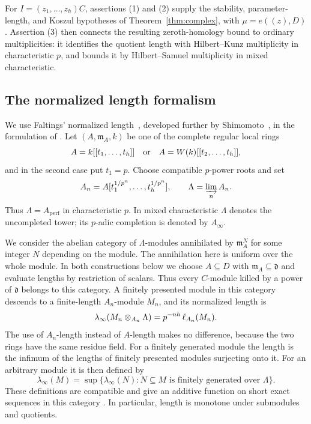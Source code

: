 For $I=(z_1,\ldots,z_h)C$, assertions (1) and (2) supply the
stability, parameter-length, and Koszul hypotheses of
Theorem~\ref{thm:complex}, with $\mu=e((z),D)$.
Assertion (3) then connects the resulting zeroth-homology bound to
ordinary multiplicities: it identifies the quotient length with
Hilbert--Kunz multiplicity in characteristic $p$, and bounds it by
Hilbert--Samuel multiplicity in mixed characteristic.

\subsection{The normalized length formalism}

We use Faltings' normalized length~\cite[Appendix~2]{Faltings},
developed further by Shimomoto~\cite[Section~2]{Shimomoto}, in the
formulation of \cite[Section~2.2]{CLMST}. Let $(A,\mathfrak
m_A,k)$ be one of the complete regular local rings
\[
 A=k[[t_1,\ldots,t_h]]
 \quad\hbox{or}\quad
 A=W(k)[[t_2,\ldots,t_h]],
\]
and in the second case put $t_1=p$.  Choose compatible $p$-power roots
and set
\[
 A_n=A[t_1^{1/p^n},\ldots,t_h^{1/p^n}],
 \qquad \Lambda=\varinjlim_n A_n.
\]
Thus $\Lambda=A_{\mathrm{perf}}$ in characteristic $p$.  In mixed
characteristic $\Lambda$ denotes the uncompleted tower; its $p$-adic
completion is denoted by $A_\infty$.

We consider the abelian category of $\Lambda$-modules annihilated by
$\mathfrak m_A^N$ for some integer $N$ depending on the module.  The
annihilation here is uniform over the whole module.  In both constructions
below we choose $A\subseteq D$ with $\mathfrak m_A\subseteq\mathfrak d$
and evaluate lengths by restriction of scalars.  Thus every $C$-module killed
by a power of $\mathfrak d$ belongs to this category.
A finitely presented
module in this category descends to a finite-length $A_n$-module $M_n$,
and its normalized length is
\begin{equation}\label{eq:normalized-finite-stage}
 \lambda_\infty(M_n\otimes_{A_n}\Lambda)
       =p^{-nh}\operatorname{\ell}_{A_n}(M_n).
\end{equation}
The use of $A_n$-length instead of $A$-length makes no difference,
because the two rings have the same residue field.  For a finitely
generated module the length is the infimum of the lengths of finitely
presented modules surjecting onto it.  For an arbitrary module it is
then defined by
\begin{equation}\label{eq:normalized-supremum}
 \lambda_\infty(M)=
 \sup\{\lambda_\infty(N):N\subseteq M
                      \text{ is finitely generated over }\Lambda\}.
\end{equation}
These definitions are compatible and give an additive function on
short exact sequences in this category
\cite[Definition~2.2.1 and Propositions~2.2.3, 2.2.6(a)]{CLMST}.
In particular, length is monotone under submodules and quotients.

